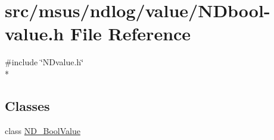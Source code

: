 \hypertarget{_n_dbool-value_8h}{\section{src/msus/ndlog/value/\-N\-Dbool-\/value.h File Reference}
\label{_n_dbool-value_8h}
}
{\ttfamily \#include \char`\"{}N\-Dvalue.\-h\char`\"{}}\\*
\subsection*{Classes}
\begin{DoxyCompactItemize}
\item 
class \hyperlink{class_n_d___bool_value}{N\-D\-\_\-\-Bool\-Value}
\end{DoxyCompactItemize}
